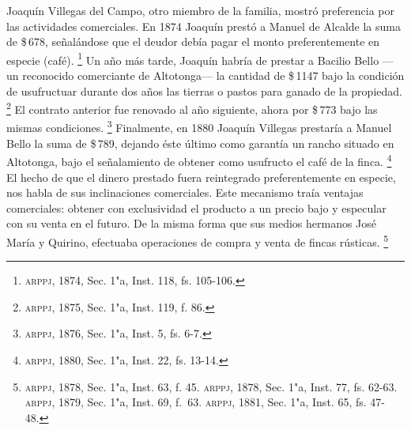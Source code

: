 \documentclass[14pt,twoside,final]{extbook} %
\let\oldfootnote\footnote
\renewcommand\footnote[1]{%
\oldfootnote{\hspace{1mm}#1}}
\begin{document}
Joaquín Villegas del Campo, otro miembro de la familia, mostró preferencia por las actividades comerciales. En 1874 Joaquín prestó a Manuel de Alcalde la suma de \$\,678, señalándose que el deudor debía pagar el monto preferentemente en especie (café).\footnote{\textsc{arppj}, 1874, Sec. 1"a, Inst. 118, fs. 105-106.} Un año más tarde, Joaquín habría de prestar a Bacilio Bello ---un reconocido comerciante de Altotonga--- la cantidad de \$\,1147 bajo la condición de usufructuar durante dos años las tierras o pastos para ganado de la propiedad.\footnote{\textsc{arppj}, 1875, Sec. 1"a, Inst. 119, f. 86.} El contrato anterior fue renovado al año siguiente, ahora por \$\,773 bajo las mismas condiciones.\footnote{\textsc{arppj}, 1876, Sec. 1"a, Inst. 5, fs. 6-7.} Finalmente, en 1880 Joaquín Villegas prestaría a Manuel Bello la suma de \$\,789, dejando éste último como garantía un rancho situado en Altotonga, bajo el señalamiento de obtener como usufructo el café de la finca.\footnote{\textsc{arppj}, 1880, Sec. 1"a, Inst. 22, fs. 13-14.} El hecho de que el dinero prestado fuera reintegrado preferentemente en especie, nos habla de sus inclinaciones comerciales. Este mecanismo traía ventajas comerciales: obtener con exclusividad el producto a un precio bajo y especular con su venta en el futuro. De la misma forma que sus medios hermanos José María y Quirino, efectuaba operaciones de compra y venta de fincas rústicas.\footnote{\textsc{arppj}, 1878, Sec. 1"a, Inst. 63, f. 45. \textsc{arppj}, 1878, Sec. 1"a, Inst. 77, fs. 62-63. \textsc{arppj}, 1879, Sec. 1"a, Inst. 69, f.~63. \textsc{arppj}, 1881, Sec. 1"a, Inst. 65, fs. 47-48.}
\end{document}
